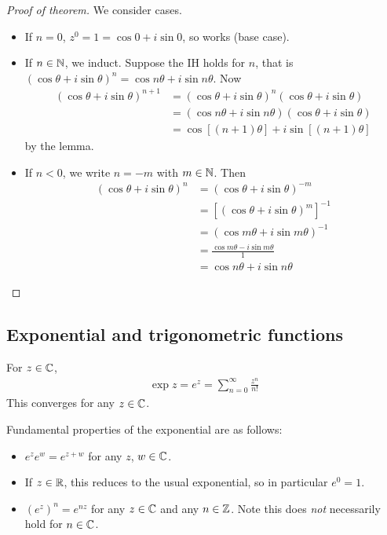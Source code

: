 \documentclass{../template/note}
\begin{document}
    \begin{proof}[Proof of theorem] We consider cases.
        \begin{itemize}
            \item If \(n=0\), \(z^0 = 1 = \cos 0 + i \sin 0\), so works (base case).
            \item If \(n \in \mathbb N\), we induct.
            Suppose the IH holds for \(n\), that is \((\cos \theta + i \sin \theta)^n = \cos n\theta + i \sin n\theta\). Now
            \begin{align*}
                (\cos \theta + i \sin \theta)^{n+1} &= (\cos \theta + i \sin \theta)^n(\cos \theta + i \sin \theta) \\
                &= (\cos n\theta + i \sin n\theta)(\cos \theta + i \sin \theta) \\
                &= \cos [(n+1)\theta] + i \sin [(n+1)\theta]
            \end{align*}
            by the lemma.
            \item If \(n < 0\), we write \(n = -m\) with \(m \in \mathbb N\). Then
            \begin{align*}
                (\cos \theta + i \sin \theta)^n &= (\cos \theta + i \sin \theta)^{-m} \\
                &= [(\cos \theta + i \sin \theta)^m]^{-1} \\
                &= (\cos m\theta + i \sin m\theta)^{-1} \\
                &= \frac{\cos m\theta - i \sin m\theta}{1} \\
                &= \cos n \theta + i \sin n \theta
            \end{align*}
        \end{itemize}
    \end{proof}
    
    \subsection{Exponential and trigonometric functions}
    
    \begin{definition}
        For \(z \in \mathbb C\),
        \begin{align*}
            \exp z = e^z = \sum_{n=0}^\infty \frac{z^n}{n!}
        \end{align*}
        This converges for any \(z \in \mathbb C\).        
    \end{definition}
    
    Fundamental properties of the exponential are as follows:
    \begin{itemize}
        \item \(e^ze^w=e^{z+w}\) for any \(z\), \(w \in \mathbb C\).
        \item If \(z \in \mathbb R\), this reduces to the usual exponential, so in particular \(e^0=1\).
        \item \((e^z)^n = e^{nz}\) for any \(z \in \mathbb C\) and any \(n \in \mathbb Z\). Note this does \emph{not} necessarily hold for \(n \in \mathbb C\). 
    \end{itemize}
    
\end{document}
